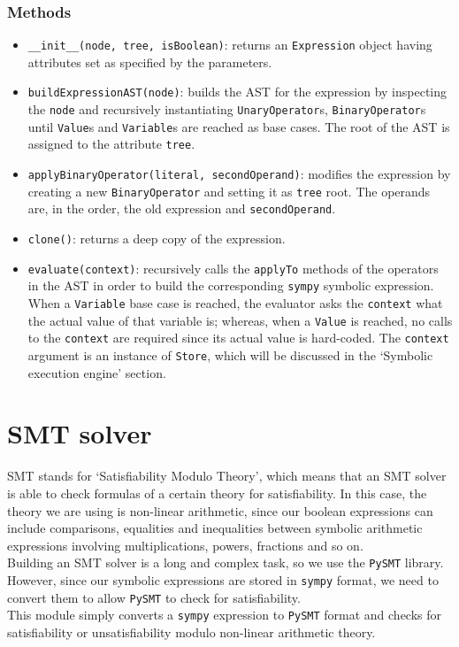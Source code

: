 \documentclass[12pt,a4paper]{report}
\theoremstyle{definition}
\theoremstyle{definition}
\theoremstyle{definition}
\begin{document}
\subsubsection{Methods}
\begin{itemize}
    \itemsep 0em
    \item \texttt{\_\_init\_\_(node, tree, isBoolean)}: returns an \texttt{Expression} object having attributes set as specified by the parameters.
    \item \texttt{buildExpressionAST(node)}: builds the AST for the expression by inspecting the \texttt{node} and recursively instantiating \texttt{UnaryOperator}s, \texttt{BinaryOperator}s until \texttt{Value}s and \texttt{Variable}s are reached as base cases. The root of the AST is assigned to the attribute \texttt{tree}.
    \item \texttt{applyBinaryOperator(literal, secondOperand)}: modifies the expression by creating a new \texttt{BinaryOperator} and setting it as \texttt{tree} root. The operands are, in the order, the old expression and \texttt{secondOperand}.
    \item \texttt{clone()}: returns a deep copy of the expression.
    \item \texttt{evaluate(context)}: recursively calls the \texttt{applyTo} methods of the operators in the AST in order to build the corresponding \texttt{sympy} symbolic expression. When a \texttt{Variable} base case is reached, the evaluator asks the \texttt{context} what the actual value of that variable is; whereas, when a \texttt{Value} is reached, no calls to the \texttt{context} are required since its actual value is hard-coded. The \texttt{context} argument is an instance of \texttt{Store}, which will be discussed in the `Symbolic execution engine' section.
\end{itemize}


\section{SMT solver}
SMT stands for `Satisfiability Modulo Theory', which means that an SMT solver is able to check formulas of a certain theory for satisfiability. In this case, the theory we are using is non-linear arithmetic, since our boolean expressions can include comparisons, equalities and inequalities between symbolic arithmetic expressions involving multiplications, powers, fractions and so on.\\
Building an SMT solver is a long and complex task, so we use the \texttt{PySMT} library. However, since our symbolic expressions are stored in \texttt{sympy} format, we need to convert them to allow \texttt{PySMT} to check for satisfiability.\\
This module simply converts a \texttt{sympy} expression to \texttt{PySMT} format and checks for satisfiability or unsatisfiability modulo non-linear arithmetic theory.
\end{document}
